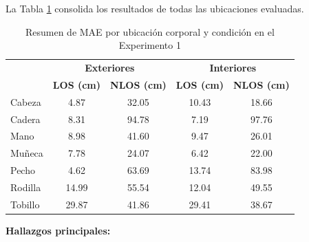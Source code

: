 La Tabla \ref{tab:resumen_todas_ubicaciones} consolida los resultados de todas las ubicaciones evaluadas.
%
\begin{table}[t]
\centering
\caption{Resumen de MAE por ubicación corporal y condición en el Experimento 1}
\label{tab:resumen_todas_ubicaciones}
\begin{tabular}{lcccc}
\toprule
\multirow{2}{*}{\cellcolor{headerblue}}
& \multicolumn{2}{c}{\cellcolor{headerblue}\textbf{Exteriores}}
& \multicolumn{2}{c}{\cellcolor{headerblue}\textbf{Interiores}} \\


\cellcolor{headerblue}\textbf{Ubicación}& \cellcolor{headerblue}\textbf{LOS (cm)}
& \cellcolor{headerblue}\textbf{NLOS (cm)}
& \cellcolor{headerblue}\textbf{LOS (cm)}
& \cellcolor{headerblue}\textbf{NLOS (cm)} \\
\midrule
Cabeza   & 4.87 & 32.05 & 10.43 & 18.66 \\
Cadera   & 8.31 & 94.78 & 7.19 & 97.76 \\
Mano     & 8.98 & 41.60 & 9.47 & 26.01 \\
Muñeca   & 7.78 & 24.07 & 6.42 & 22.00 \\
Pecho    & 4.62 & 63.69 & 13.74 & 83.98 \\
Rodilla  & 14.99 & 55.54 & 12.04 & 49.55 \\
Tobillo  & 29.87 & 41.86 & 29.41 & 38.67 \\
\bottomrule
\end{tabular}
\end{table}

\textbf{Hallazgos principales:}

